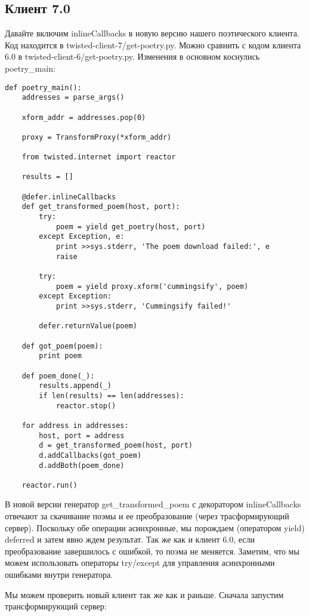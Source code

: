 \subsection{Клиент 7.0}

Давайте включим inlineCallbacks в новую версию нашего поэтического 
клиента. Код находится в twisted-client-7/get-poetry.py. 
Можно сравнить с кодом клиента 6.0 в twisted-client-6/get-poetry.py. 
Изменения в основном коснулись poetry\_main:

 \begin{verbatim}
def poetry_main():
    addresses = parse_args()

    xform_addr = addresses.pop(0)

    proxy = TransformProxy(*xform_addr)

    from twisted.internet import reactor

    results = []

    @defer.inlineCallbacks
    def get_transformed_poem(host, port):
        try:
            poem = yield get_poetry(host, port)
        except Exception, e:
            print >>sys.stderr, 'The poem download failed:', e
            raise

        try:
            poem = yield proxy.xform('cummingsify', poem)
        except Exception:
            print >>sys.stderr, 'Cummingsify failed!'

        defer.returnValue(poem)

    def got_poem(poem):
        print poem

    def poem_done(_):
        results.append(_)
        if len(results) == len(addresses):
            reactor.stop()

    for address in addresses:
        host, port = address
        d = get_transformed_poem(host, port)
        d.addCallbacks(got_poem)
        d.addBoth(poem_done)

    reactor.run()
\end{verbatim} 


В новой версии генератор get\_transformed\_poem с декоратором 
inlineCallbacks отвечают за скачивание поэмы и ее 
преобразование (через трасформирующий сервер). Поскольку 
обе операции асинхронные, мы порождаем (оператором yield) 
deferred и затем явно ждем результат. Так же как и клиент 6.0, 
если преобразование завершилось с ошибкой, то поэма не 
меняется. Заметим, что мы можем использовать операторы 
try/except для управления асинхронными ошибками внутри 
генератора.


Мы можем проверить новый клиент так же как и раньше. 
Сначала запустим трансформирующий сервер:

